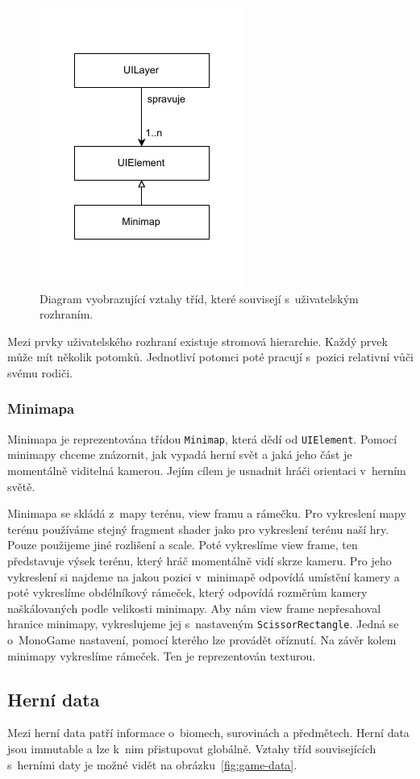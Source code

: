 \begin{figure}[!htb]
  \centering
  \includegraphics[width=0.35\linewidth]{img/ui-layer.pdf}
  \caption{Diagram vyobrazující vztahy tříd, které souvisejí s~uživatelským rozhraním.}
  \label{fig:ui-layer}
\end{figure}

Mezi prvky uživatelského rozhraní existuje stromová hierarchie. Každý prvek může mít několik potomků. Jednotliví potomci poté pracují s~pozici relativní vůči svému rodiči.

\subsubsection{Minimapa}
Minimapa je reprezentována třídou \texttt{Minimap}, která dědí od \texttt{UIElement}. Pomocí minimapy chceme znázornit, jak vypadá herní svět a jaká jeho část je momentálně viditelná kamerou. Jejím cílem je usnadnit hráči orientaci v~herním světě.

Minimapa se skládá z~mapy terénu, view framu a rámečku. Pro vykreslení mapy terénu používáme stejný fragment shader jako pro vykreslení terénu naší hry. Pouze použijeme jiné rozlišení a scale. Poté vykreslíme view frame, ten představuje výsek terénu, který hráč momentálně vidí skrze kameru. Pro jeho vykreslení si najdeme na jakou pozici v~minimapě odpovídá umístění kamery a poté vykreslíme obdélníkový rámeček, který odpovídá rozměrům kamery naškálovaných podle velikosti minimapy. Aby nám view frame nepřesahoval hranice minimapy, vykreslujeme jej s~nastaveným \texttt{ScissorRectangle}. Jedná se o~MonoGame nastavení, pomocí kterého lze provádět oříznutí. Na závěr kolem minimapy vykreslíme rámeček. Ten je reprezentován texturou.

\subsection{Herní data}
Mezi herní data patří informace o~biomech, surovinách a předmětech. Herní data jsou immutable a lze k~nim přistupovat globálně. Vztahy tříd souvisejících s~herními daty je možné vidět na obrázku~\ref{fig:game-data}.

